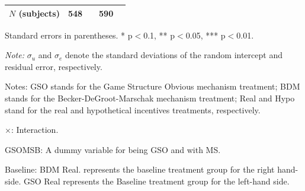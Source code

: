 \documentclass[12pt]{article}
\begin{document}
\begin{table}[H]
{\begin{tabular}{l*{2}{cc}}
\(N\) (subjects)      &        548         &            &        590        &            \\
\hline\hline
\end{tabular}
}



\begin{tablenotes}
            \footnotesize
            \item Standard errors in parentheses. * p$<$0.1, ** p$<$0.05, *** p$<$0.01.
            \item \textit{Note:} $\sigma_u$ and $\sigma_e$ denote the standard deviations of the random intercept and residual error, respectively.
            \item Notes: GSO stands for the Game Structure Obvious mechanism treatment; BDM stands for the Becker-DeGroot-Marschak mechanism treatment; Real and Hypo stand for the real and hypothetical incentives treatments, respectively.
           \item $\times$: Interaction.
           \item GSOMSB: A dummy variable for being GSO and with MS.
           \item Baseline: BDM Real. represents the baseline treatment group for the right hand-side.
           GSO Real represents the Baseline treatment group for the left-hand side.
        \end{tablenotes}
\end{table}


\clearpage




\begin{table}[H]
    \centering
    \caption{Rank-sum test results for time spent across elicitation tasks}
    \label{tab:Appendix time1}
\end{table}
\end{document}
